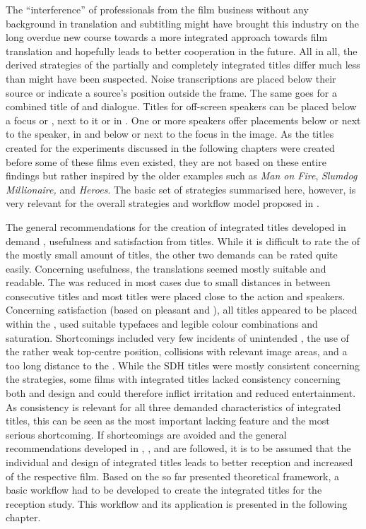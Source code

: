 The ``interference'' of professionals from the film business without any background in translation and subtitling might have brought this industry on the long overdue new course towards a more integrated approach towards film translation and hopefully leads to better cooperation in the future. All in all, the derived strategies of the partially and completely integrated titles differ much less than might have been suspected. Noise transcriptions are placed below their source or indicate a source’s position outside the frame. The same goes for a combined title of  and dialogue. Titles for off-screen speakers can be placed below a focus or , next to it or in . One or more speakers offer placements below or next to the speaker, in  and below or next to the focus in the image. As the titles created for the experiments discussed in the following chapters were created before some of these films even existed, they are not based on these entire findings but rather inspired by the older examples such as \textit{Man on Fire}, \textit{Slumdog Millionaire,} and \textit{Heroes}. The basic set of  strategies summarised here, however, is very relevant for the overall strategies and workflow model proposed in .

The general recommendations for the creation of integrated titles developed in  demand , usefulness and satisfaction from titles. While it is difficult to rate the  of the mostly small amount of titles, the other two demands can be rated quite easily. Concerning usefulness, the translations seemed mostly suitable and readable. The  was reduced in most cases due to small distances in between consecutive titles and most titles were placed close to the action and speakers. Concerning satisfaction (based on pleasant  and ), all titles appeared to be placed within the , used suitable typefaces and legible colour combinations and saturation. Shortcomings included very few incidents of unintended , the use of the rather weak top-centre position, collisions with relevant image areas, and a too long distance to the . While the SDH titles were mostly consistent concerning the  strategies, some films with integrated titles lacked consistency concerning both  and design and could therefore inflict irritation and reduced entertainment. As consistency is relevant for all three demanded characteristics of integrated titles, this can be seen as the most important lacking feature and the most serious shortcoming. If shortcomings are avoided and the general recommendations developed in , , and  are followed, it is to be assumed that the individual  and design of integrated titles leads to better reception and increased  of the respective film. Based on the so far presented theoretical framework, a basic workflow had to be developed to create the integrated titles for the reception study. This workflow and its application is presented in the following chapter.

